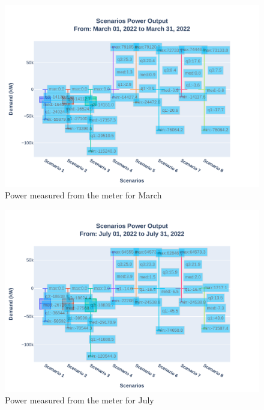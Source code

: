 \documentclass[conference,  usletter]{IEEEtran}
\begin{document}
\begin{figure}
\centering
\includegraphics[width=1\linewidth]{Fig/Option_3/0_Scn_Output_Run_3_Mar_01_2022_to_Mar_31_2022}
\caption{\footnotesize  Power measured from the meter for March}
\label{fig:0scnoutputrun2mar012022tomar312022}
\end{figure}
\begin{figure}
\centering
\includegraphics[width=1\linewidth]{Fig/Option_3/4_Scn_Output_Run_3_Jul_01_2022_to_Jul_31_2022}
\caption{\footnotesize  Power measured from the meter for July}
\label{fig:4scnoutputrun2jul012022tojul312022}
\end{figure}
\end{document}
